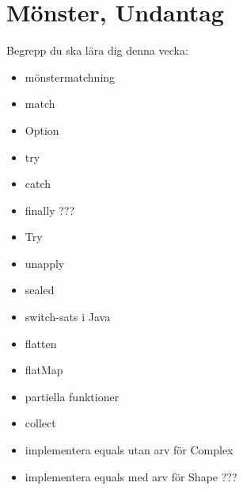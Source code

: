 \chapter{Mönster, Undantag}\label{chapter:W08}
Begrepp du ska lära dig denna vecka:
\begin{itemize}[noitemsep,label={$\square$},leftmargin=*]
\item mönstermatchning
\item match
\item Option
\item try
\item catch
\item finally ???
\item Try
\item unapply
\item sealed
\item switch-sats i Java
\item flatten
\item flatMap
\item partiella funktioner
\item collect
\item implementera equals utan arv för Complex
\item implementera equals med arv för Shape ???\end{itemize}
